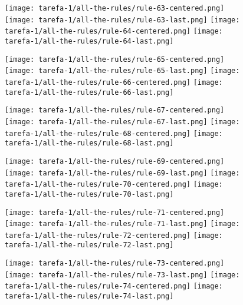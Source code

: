 \begin{figure}[htbp]
  \centering
\texttt{[image: tarefa-1/all-the-rules/rule-63-centered.png]}
\texttt{[image: tarefa-1/all-the-rules/rule-63-last.png]}
\texttt{[image: tarefa-1/all-the-rules/rule-64-centered.png]}
\texttt{[image: tarefa-1/all-the-rules/rule-64-last.png]}
\end{figure}
\begin{figure}[htbp]
  \centering
\texttt{[image: tarefa-1/all-the-rules/rule-65-centered.png]}
\texttt{[image: tarefa-1/all-the-rules/rule-65-last.png]}
\texttt{[image: tarefa-1/all-the-rules/rule-66-centered.png]}
\texttt{[image: tarefa-1/all-the-rules/rule-66-last.png]}
\end{figure}
\begin{figure}[htbp]
  \centering
\texttt{[image: tarefa-1/all-the-rules/rule-67-centered.png]}
\texttt{[image: tarefa-1/all-the-rules/rule-67-last.png]}
\texttt{[image: tarefa-1/all-the-rules/rule-68-centered.png]}
\texttt{[image: tarefa-1/all-the-rules/rule-68-last.png]}
\end{figure}
\begin{figure}[htbp]
  \centering
\texttt{[image: tarefa-1/all-the-rules/rule-69-centered.png]}
\texttt{[image: tarefa-1/all-the-rules/rule-69-last.png]}
\texttt{[image: tarefa-1/all-the-rules/rule-70-centered.png]}
\texttt{[image: tarefa-1/all-the-rules/rule-70-last.png]}
\end{figure}
\begin{figure}[htbp]
  \centering
\texttt{[image: tarefa-1/all-the-rules/rule-71-centered.png]}
\texttt{[image: tarefa-1/all-the-rules/rule-71-last.png]}
\texttt{[image: tarefa-1/all-the-rules/rule-72-centered.png]}
\texttt{[image: tarefa-1/all-the-rules/rule-72-last.png]}
\end{figure}
\begin{figure}[htbp]
  \centering
\texttt{[image: tarefa-1/all-the-rules/rule-73-centered.png]}
\texttt{[image: tarefa-1/all-the-rules/rule-73-last.png]}
\texttt{[image: tarefa-1/all-the-rules/rule-74-centered.png]}
\texttt{[image: tarefa-1/all-the-rules/rule-74-last.png]}
\end{figure}
